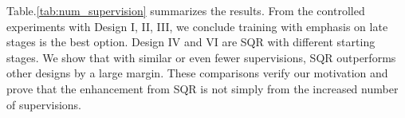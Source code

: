 \documentclass[10pt,twocolumn,letterpaper]{article}
\begin{document}
Table.\ref{tab:num_supervision} summarizes the results. From the controlled experiments with Design I, II, III, we conclude training with emphasis on late stages is the best option. Design IV and VI are SQR with different starting stages.  We show that with similar or even fewer supervisions, SQR outperforms other designs by a large margin. These comparisons verify our motivation and prove that the enhancement from SQR is not simply from the increased number of supervisions. 



\begin{comment}
\begin{table}[t!]
\centering
    \begin{tabular}{@{}c|c|c@{}}
    \toprule[1pt]
    \multicolumn{3}{c}{Adamixer trained with group queries} \\ 
        \multicolumn{1}{c|}{Pathway} & \multicolumn{1}{c|}{\#$Supv$ / stage} & AP \\ \midrule
        \resizebox{0.10\textwidth}{!}{$3 \times \mathcal{PT}^{1\text{-}2\text{-}3\text{-}4\text{-}5\text{-}6}$} & 3,3,3,3,3,3 & 43.4 \\ 
        \resizebox{0.28\textwidth}{!}{$\mathcal{PT}^{1\text{-}2\text{-}3\text{-}4\text{-}5\text{-}6}, \mathcal{PT}^{1\text{-}2\text{-}3\text{-}4\text{-}5}, \mathcal{PT}^{1\text{-}2\text{-}3\text{-}4}, \mathcal{PT}^{1\text{-}2\text{-}3}$} & 4,4,4,3,2,1  & 43.0\\
\resizebox{0.28\textwidth}{!}{$\mathcal{PT}^{1\text{-}2\text{-}3\text{-}4\text{-}5\text{-}6}, \mathcal{PT}^{2\text{-}3\text{-}4\text{-}5\text{-}6}, \mathcal{PT}^{3\text{-}4\text{-}5\text{-}6},  \mathcal{PT}^{4\text{-}5\text{-}6}$} & 1,2,3,4,4,4 & \textbf{43.7}\\
\bottomrule
    \end{tabular}
    \caption{Adamixer trained with group queries. Pathway denotes how each group of queries traverses through the decoder, e.g., the 1\textsuperscript{st} row represents all 3 groups of queries go through all 6 stages, while the 2\textsuperscript{nd} row represents 4 groups of queries but the 2\textsuperscript{nd} group ends early at stage 5, etc. \#$Supv$ / stage represents the number of supervision applied at each decoder stage. All models are trained for 12 epochs and inferenced using the basic pathway and results are reported on COCO val set.}
    \label{tab:num of supervision1}
\end{table}

Our SQR places even stronger emphasis on the later stages as the number of supervision grows quickly as the stage goes deeper. To fairly compare with SQR, we train another Adamixer with 6 groups  (36 \#$Supv$), while the SQR model only has 32 \#$Supv$ (1+2+3+5+8+13), and yet still outperforms the group query counterpart by +0.8 AP (see Table \ref{tab:num of supervision2}).


\end{comment}
\end{document}
